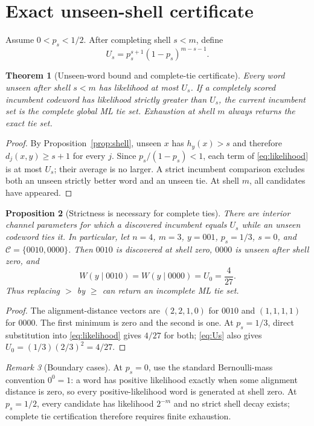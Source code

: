 \documentclass[11pt]{article}
\newtheorem{theorem}{Theorem}
\newtheorem{proposition}[theorem]{Proposition}
\theoremstyle{remark}\newtheorem{remark}[theorem]{Remark}
\newcommand{\C}{\mathcal C}\newcommand{\I}{\mathcal I}\newcommand{\one}{\mathbf 1}
\begin{document}
\section{Exact unseen-shell certificate}
Assume $0<p_s<1/2$. After completing shell $s<m$, define
\begin{equation}
 U_s=p_s^{s+1}(1-p_s)^{m-s-1}. \label{eq:Us}
\end{equation}
\begin{theorem}[Unseen-word bound and complete-tie certificate]\label{thm:cert}
Every word unseen after shell $s<m$ has likelihood at most $U_s$. If a completely scored incumbent
codeword has likelihood strictly greater than $U_s$, the current incumbent set is the complete
global ML tie set. Exhaustion at shell $m$ always returns the exact tie set.
\end{theorem}
\begin{proof}
By Proposition~\ref{prop:shell}, unseen $x$ has $h_y(x)>s$ and therefore
$d_j(x,y)\ge s+1$ for every $j$. Since $p_s/(1-p_s)<1$, each term of \eqref{eq:likelihood} is at
most $U_s$; their average is no larger. A strict incumbent comparison excludes both an unseen
strictly better word and an unseen tie. At shell $m$, all candidates have appeared.
\end{proof}

\begin{proposition}[Strictness is necessary for complete ties]\label{prop:strictwitness}
There are interior channel parameters for which a discovered incumbent equals $U_s$ while an unseen
codeword ties it. In particular, let $n=4$, $m=3$, $y=001$, $p_s=1/3$, $s=0$, and
$\C=\{0010,0000\}$. Then $0010$ is discovered at shell zero, $0000$ is unseen after shell zero,
and
\[
 W(y\mid0010)=W(y\mid0000)=U_0=\frac4{27}.
\]
Thus replacing $>$ by $\ge$ can return an incomplete ML tie set.
\end{proposition}
\begin{proof}
The alignment-distance vectors are $(2,2,1,0)$ for $0010$ and $(1,1,1,1)$ for $0000$. The first
minimum is zero and the second is one. At $p_s=1/3$, direct substitution into
\eqref{eq:likelihood} gives $4/27$ for both; \eqref{eq:Us} also gives $U_0=(1/3)(2/3)^2=4/27$.
\end{proof}

\begin{remark}[Boundary cases]
At $p_s=0$, use the standard Bernoulli-mass convention $0^0=1$: a word has positive likelihood
exactly when some alignment distance is zero, so every positive-likelihood word is generated at
shell zero. At $p_s=1/2$, every candidate has likelihood $2^{-m}$ and no strict shell decay exists;
complete tie certification therefore requires finite exhaustion.
\end{remark}
\end{document}
